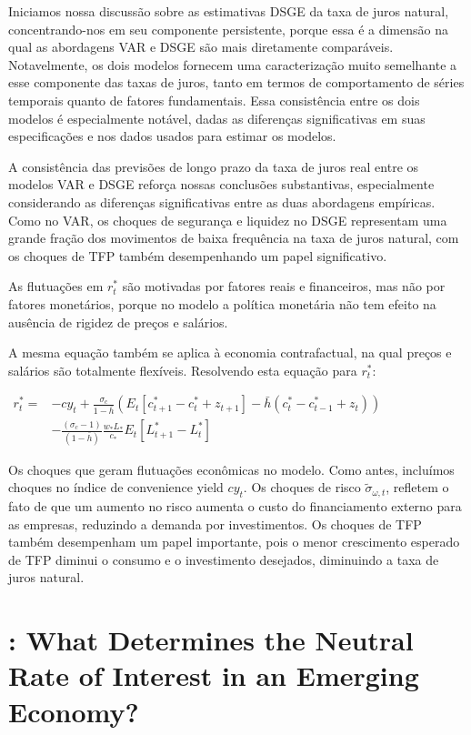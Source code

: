 Iniciamos nossa discussão sobre as estimativas DSGE da taxa de juros natural, concentrando-nos em seu componente persistente, porque essa é a dimensão na qual as abordagens VAR e DSGE são mais diretamente comparáveis. Notavelmente, os dois modelos fornecem uma caracterização muito semelhante a esse componente das taxas de juros, tanto em termos de comportamento de séries temporais quanto de fatores fundamentais. Essa consistência entre os dois modelos é especialmente notável, dadas as diferenças significativas em suas especificações e nos dados usados para estimar os modelos.

A consistência das previsões de longo prazo da taxa de juros real entre os modelos VAR e DSGE reforça nossas conclusões substantivas, especialmente considerando as diferenças significativas entre as duas abordagens empíricas. Como no VAR, os choques de segurança e liquidez no DSGE representam uma grande fração dos movimentos de baixa frequência na taxa de juros natural, com os choques de TFP também desempenhando um papel significativo.

As flutuações em $r_{t}^{*}$ são motivadas por fatores reais e financeiros, mas não por fatores monetários, porque no modelo a política monetária não tem efeito na ausência de rigidez de preços e salários.

A mesma equação também se aplica à economia contrafactual, na qual preços e salários são totalmente flexíveis. Resolvendo esta equação para $r_{t}^{*}$:

$\begin{aligned} r_{t}^{*}=&-c y_{t}+\frac{\sigma_{c}}{1-\bar{h}}\left(E_{t}\left[c_{t+1}^{*}-c_{t}^{*}+z_{t+1}\right]-\bar{h}\left(c_{t}^{*}-c_{t-1}^{*}+z_{t}\right)\right) \\ &-\frac{\left(\sigma_{c}-1\right)}{(1-\bar{h})} \frac{w_{*} L_{*}}{c_{*}} E_{t}\left[L_{t+1}^{*}-L_{t}^{*}\right] \end{aligned}$

Os choques que geram flutuações econômicas no modelo. Como antes, incluímos choques no índice de convenience yield $cy_t$. Os choques de risco $\tilde{\sigma}_{\omega,t}$, refletem o fato de que um aumento no risco aumenta o custo do financiamento externo para as empresas, reduzindo a demanda por investimentos. Os choques de TFP também desempenham um papel importante, pois o menor crescimento esperado de TFP diminui o consumo e o investimento desejados, diminuindo a taxa de juros natural.
%
%
\section{\citet{Carrillo:2018}: What Determines the Neutral Rate of Interest in an
Emerging Economy? }

